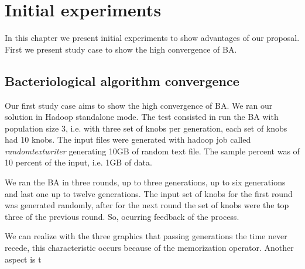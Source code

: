 \chapter{Initial experiments} %
\label{cha:experiments}

In this chapter we present initial experiments to show advantages of our proposal.
First we present study case to show the high convergence of BA.

\section{Bacteriological algorithm convergence}

Our first study case aims to show the high convergence of BA. We ran our solution
in Hadoop standalone mode. The test consisted in run the BA with population
size 3, i.e. with three set of knobs per generation, each set of knobs had 10 knobs.
The input files were generated with hadoop job called {\it randomtextwriter} generating
10GB of random text file. The sample percent was of 10 percent of the input, i.e.
1GB of data.

We ran the BA in three rounds, up to three generations, up to six generations and
last one up to twelve generations. The input set of knobs for the first round was
generated randomly, after for the next round the set of knobs were the top three
of the previous round. So, ocurring feedback of the process.

We can realize with the three graphics that passing generations the time never
recede, this characteristic occurs because of the memorization operator. Another
aspect is t 
